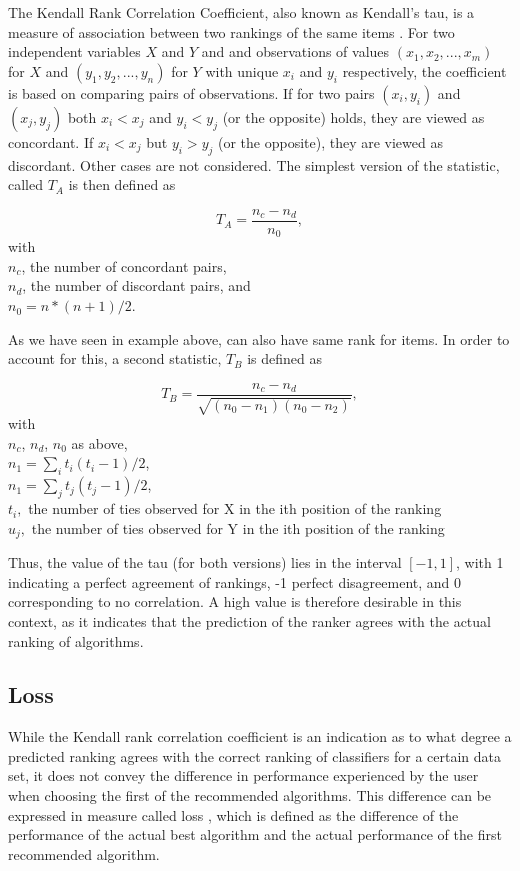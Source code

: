 The Kendall Rank Correlation Coefficient, also known as Kendall's tau, is a measure of association between two rankings of the same items \cite{kendall1938new}. For two independent variables $X$ and $Y$ and and observations of values $(x_1,x_2,...,x_m)$ for $X$ and $(y_1,y_2,...,y_n)$ for $Y$ with unique $x_i$ and $y_i$ respectively, the coefficient is based on comparing pairs of observations. If for two pairs $(x_i,y_i)$ and $(x_j,y_j)$ both $x_i < x_j$ and $y_i < y_j$ (or the opposite) holds, they are viewed as concordant. If $x_i < x_j$ but $y_i > y_j$ (or the opposite), they are viewed as discordant. Other cases are not considered. The simplest version of the statistic, called $T_A$ is then defined as 

$$T_A = \frac{n_c - n_d}{n_0},$$
with \\
$n_c$, the number of concordant pairs, \\
$n_d$, the number of discordant pairs, and \\
$n_0 = n * (n + 1) / 2$.

As we have seen in example above, can also have same rank for items. In order to account for this, a second statistic, $T_B$ is defined as

$$T_B = \frac{n_c - n_d}{\sqrt{(n_0 - n_1 )(n_0 - n_2 )}},$$
with \\
$n_c$, $n_d$, $n_0$ as above, \\
$n_1=\sum_i{t_i(t_i-1)/2}$, \\
$n_1=\sum_j{t_j(t_j-1)/2}$, \\
$t_i,$ the number of ties observed for X in the ith position of the ranking \\
$u_j,$ the number of ties observed for Y in the ith position of the ranking 

Thus, the value of the tau (for both versions) lies in the interval $[-1,1]$, with 1 indicating a perfect agreement of rankings, -1 perfect disagreement, and 0 corresponding to no correlation. A high value is therefore desirable in this context, as it indicates that the prediction of the ranker agrees with the actual ranking of algorithms.


\subsection{Loss}
While the Kendall rank correlation coefficient is an indication as to what degree a predicted ranking agrees with the correct ranking of classifiers for a certain data set, it does not convey the difference in performance experienced by the user when choosing the first of the recommended algorithms. This difference can be expressed in measure called loss \cite{DBLP:conf/mldm/LeiteBV12}, which is defined as the difference of the performance of the actual best algorithm and the actual performance of the first recommended algorithm. 


